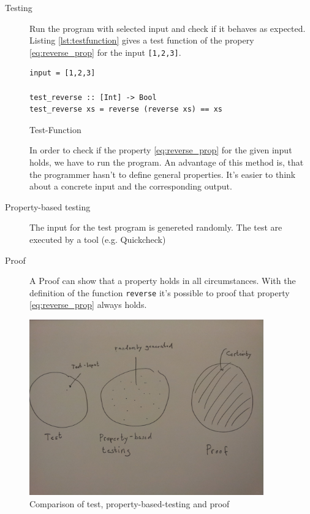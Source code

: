 \documentclass[twoside, a4paper]{article}
\begin{document}
\begin{description}
\item[Testing] Run the program with selected input and check if it behaves as expected. Listing \ref{lst:testfunction} gives a test function of the propery \ref{eq:reverse_prop} for the input \verb|[1,2,3]|.
  \label{fig:test}
\begin{program}
\begin{verbatim}
input = [1,2,3]

test_reverse :: [Int] -> Bool
test_reverse xs = reverse (reverse xs) == xs
\end{verbatim}
\caption{Test-Function}
\label{lst:testfunction}
\end{program}

In order to check if the property \ref{eq:reverse_prop} for the given input holds, we have to run the program.
 An advantage of this method is, that the programmer hasn't to define general properties. It's easier to think about a concrete input and the corresponding output.

\item[Property-based testing] The input for the test program is genereted randomly. The test are executed by a tool (e.g. Quickcheck)
\item[Proof] A Proof can show that a property holds in all circumstances. With the definition of the function \verb|reverse| it's possible to proof that property \ref{eq:reverse_prop} always holds. 
\end{description}

\begin{figure}
  \centering
     \includegraphics[width=0.9\textwidth]{comp}
  \caption{Comparison of test, property-based-testing and proof}
  \label{fig:property_validation}
\end{figure}
\end{document}
